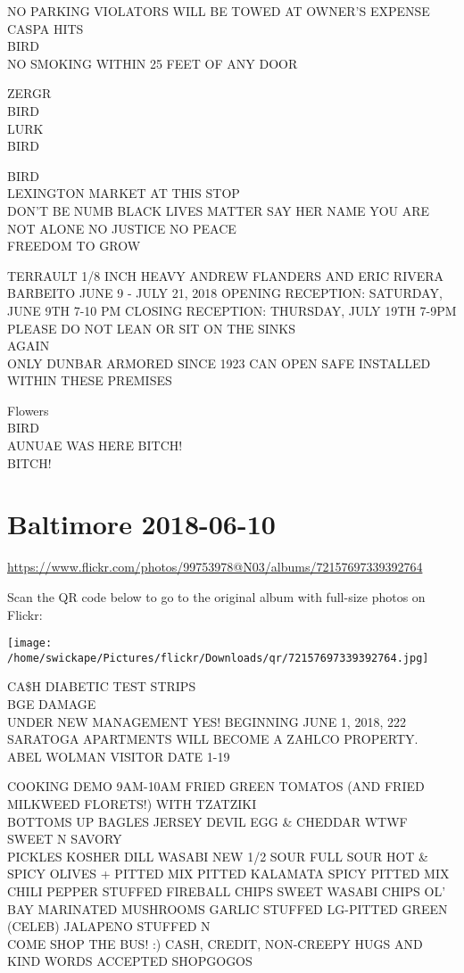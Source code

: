 \documentclass[10pt,letterpaper]{article}
\begin{document}
NO PARKING VIOLATORS WILL BE TOWED AT OWNER'S EXPENSE\\
CASPA HITS\\
BIRD\\
NO SMOKING WITHIN 25 FEET OF ANY DOOR

ZERGR\\
BIRD\\
LURK\\
BIRD

BIRD\\
LEXINGTON MARKET AT THIS STOP\\
DON'T BE NUMB BLACK LIVES MATTER SAY HER NAME YOU ARE NOT ALONE NO JUSTICE NO PEACE\\
FREEDOM TO GROW

TERRAULT 1/8 INCH HEAVY ANDREW FLANDERS AND ERIC RIVERA BARBEITO JUNE 9 {-} JULY 21, 2018 OPENING RECEPTION: SATURDAY, JUNE 9TH 7{-}10 PM CLOSING RECEPTION: THURSDAY, JULY 19TH 7{-}9PM\\
PLEASE DO NOT LEAN OR SIT ON THE SINKS\\
AGAIN\\
ONLY DUNBAR ARMORED SINCE 1923 CAN OPEN SAFE INSTALLED WITHIN THESE PREMISES

Flowers\\
BIRD\\
AUNUAE WAS HERE BITCH!\\
BITCH!


\section*{Baltimore 2018-06-10}

\url{https://www.flickr.com/photos/99753978@N03/albums/72157697339392764}

Scan the QR code below to go to the original album with full-size photos on Flickr:

\texttt{[image: /home/swickape/Pictures/flickr/Downloads/qr/72157697339392764.jpg]}


CA\$H DIABETIC TEST STRIPS\\
BGE DAMAGE\\
UNDER NEW MANAGEMENT YES!  BEGINNING JUNE 1, 2018, 222 SARATOGA APARTMENTS WILL BECOME A ZAHLCO PROPERTY.\\
ABEL WOLMAN VISITOR DATE 1{-}19

COOKING DEMO 9AM{-}10AM FRIED GREEN TOMATOS (AND FRIED MILKWEED FLORETS!) WITH TZATZIKI\\
BOTTOMS UP BAGLES JERSEY DEVIL EGG \& CHEDDAR WTWF SWEET N SAVORY\\
PICKLES KOSHER DILL WASABI NEW 1/2 SOUR FULL SOUR HOT \& SPICY OLIVES + PITTED MIX PITTED KALAMATA SPICY PITTED MIX CHILI PEPPER STUFFED FIREBALL CHIPS SWEET WASABI CHIPS OL' BAY MARINATED MUSHROOMS GARLIC STUFFED LG{-}PITTED GREEN (CELEB) JALAPENO STUFFED N\\
COME SHOP THE BUS!  :) CASH, CREDIT, NON{-}CREEPY HUGS AND KIND WORDS ACCEPTED SHOPGOGOS
\end{document}
